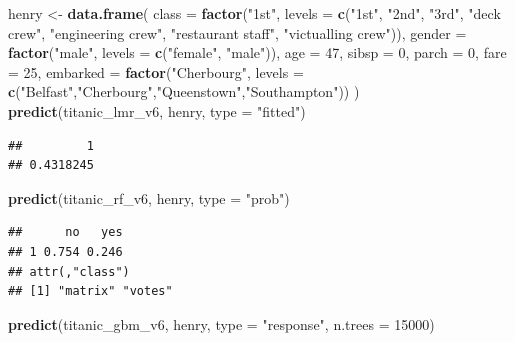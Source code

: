 \documentclass[12pt,]{krantz}
\newenvironment{Shaded}{\begin{snugshade}}{\end{snugshade}}
\newcommand{\DataTypeTok}[1]{\textcolor[rgb]{0.13,0.29,0.53}{#1}}
\newcommand{\DecValTok}[1]{\textcolor[rgb]{0.00,0.00,0.81}{#1}}
\newcommand{\KeywordTok}[1]{\textcolor[rgb]{0.13,0.29,0.53}{\textbf{#1}}}
\newcommand{\NormalTok}[1]{#1}
\newcommand{\StringTok}[1]{\textcolor[rgb]{0.31,0.60,0.02}{#1}}
\begin{document}
\begin{Shaded}
\begin{Highlighting}[]
\NormalTok{henry \textless{}{-}}\StringTok{ }\KeywordTok{data.frame}\NormalTok{(}
            \DataTypeTok{class =} \KeywordTok{factor}\NormalTok{(}\StringTok{"1st"}\NormalTok{, }\DataTypeTok{levels =} \KeywordTok{c}\NormalTok{(}\StringTok{"1st"}\NormalTok{, }\StringTok{"2nd"}\NormalTok{, }\StringTok{"3rd"}\NormalTok{, }\StringTok{"deck crew"}\NormalTok{, }\StringTok{"engineering crew"}\NormalTok{, }\StringTok{"restaurant staff"}\NormalTok{, }\StringTok{"victualling crew"}\NormalTok{)),}
            \DataTypeTok{gender =} \KeywordTok{factor}\NormalTok{(}\StringTok{"male"}\NormalTok{, }\DataTypeTok{levels =} \KeywordTok{c}\NormalTok{(}\StringTok{"female"}\NormalTok{, }\StringTok{"male"}\NormalTok{)),}
            \DataTypeTok{age =} \DecValTok{47}\NormalTok{,}
            \DataTypeTok{sibsp =} \DecValTok{0}\NormalTok{,}
            \DataTypeTok{parch =} \DecValTok{0}\NormalTok{,}
            \DataTypeTok{fare =} \DecValTok{25}\NormalTok{,}
            \DataTypeTok{embarked =} \KeywordTok{factor}\NormalTok{(}\StringTok{"Cherbourg"}\NormalTok{, }\DataTypeTok{levels =} \KeywordTok{c}\NormalTok{(}\StringTok{"Belfast"}\NormalTok{,}\StringTok{"Cherbourg"}\NormalTok{,}\StringTok{"Queenstown"}\NormalTok{,}\StringTok{"Southampton"}\NormalTok{))}
\NormalTok{)}
\KeywordTok{predict}\NormalTok{(titanic\_lmr\_v6, henry, }\DataTypeTok{type =} \StringTok{"fitted"}\NormalTok{)}
\end{Highlighting}
\end{Shaded}

\begin{verbatim}
##         1 
## 0.4318245
\end{verbatim}

\begin{Shaded}
\begin{Highlighting}[]
\KeywordTok{predict}\NormalTok{(titanic\_rf\_v6, henry, }\DataTypeTok{type =} \StringTok{"prob"}\NormalTok{)}
\end{Highlighting}
\end{Shaded}

\begin{verbatim}
##      no   yes
## 1 0.754 0.246
## attr(,"class")
## [1] "matrix" "votes"
\end{verbatim}

\begin{Shaded}
\begin{Highlighting}[]
\KeywordTok{predict}\NormalTok{(titanic\_gbm\_v6, henry, }\DataTypeTok{type =} \StringTok{"response"}\NormalTok{, }\DataTypeTok{n.trees =} \DecValTok{15000}\NormalTok{)}
\end{Highlighting}
\end{Shaded}
\end{document}
